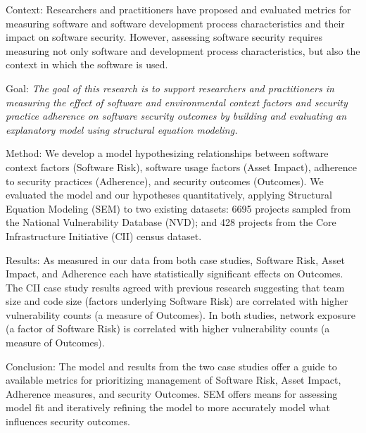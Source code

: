 \label{sec:abstract}
Context: Researchers and practitioners have proposed and evaluated metrics for measuring software and software development process characteristics and their impact on software security. However, assessing software security requires measuring not only software and development process characteristics, but also the context in which the software is used. 

Goal:  \textit{The goal of this research is to support researchers and practitioners in measuring the effect of software and environmental context factors and security practice adherence on software security outcomes by building and evaluating an explanatory model using structural equation modeling.} 

Method: We develop a model hypothesizing relationships between software context factors (Software Risk), software usage factors (Asset Impact), adherence to security practices (Adherence), and security outcomes (Outcomes).  We evaluated the model and our hypotheses quantitatively, applying Structural Equation Modeling (SEM) to two existing datasets: 6695 projects sampled from the National Vulnerability Database (NVD); and 428 projects from the Core Infrastructure Initiative (CII) census dataset.  

Results: As measured in our data from both case studies, Software Risk, Asset Impact, and Adherence each have statistically significant effects on Outcomes. The CII case study results agreed with previous research suggesting that team size and code size (factors underlying Software Risk) are correlated with higher vulnerability counts (a measure of Outcomes). In both studies, network exposure (a factor of Software Risk) is correlated with higher vulnerability counts (a measure of Outcomes).

Conclusion: The model and results from the two case studies offer a guide to available metrics for prioritizing management of Software Risk, Asset Impact, Adherence measures, and security Outcomes. SEM offers means for assessing model fit and iteratively refining the model to more accurately model what influences security outcomes.